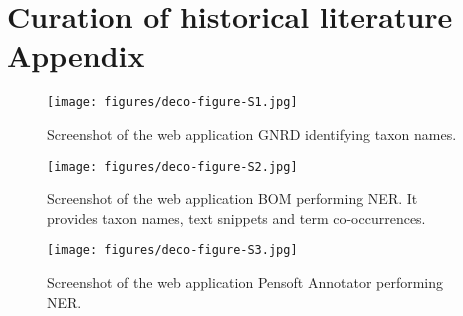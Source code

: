 
\chapter{Curation of historical literature Appendix} %

\label{AppendixB} 

   \begin{figure}[h]
      \centering
      \texttt{[image: figures/deco-figure-S1.jpg]}
      \caption[GNRD taxon names identification]{Screenshot of the web application GNRD identifying taxon names.}
      \label{fig:gnrd-screenshot}
   \end{figure}

   \begin{figure}[h]
      \centering
      \texttt{[image: figures/deco-figure-S2.jpg]}
      \caption[BOM performing NER]{Screenshot of the web application BOM performing NER. It provides taxon names, text snippets and term co-occurrences.}
      \label{fig:bom-screenshot}
   \end{figure}
   
   \begin{figure}[h]
      \centering
      \texttt{[image: figures/deco-figure-S3.jpg]}
      \caption[Pensoft Annotator performing NER]{Screenshot of the web application Pensoft Annotator performing NER.}
      \label{fig:pensoft-annotator-screenshot}
   \end{figure}

